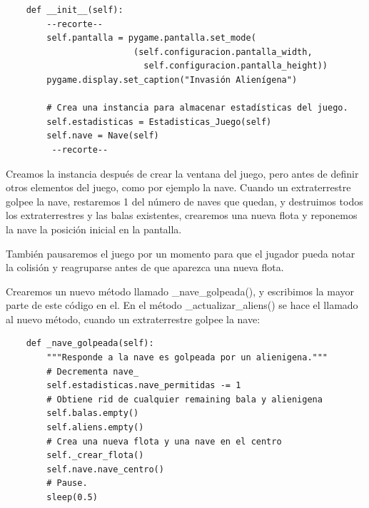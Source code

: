 \hspace{-2.4cm}{\ttfamily \scriptsize invasión}

\vspace{-0.2cm}
\hspace{-2.1cm}{\ttfamily \scriptsize \_alien.py}\vspace{-0.84cm}
\begin{lstlisting}
    def __init__(self):
        --recorte--
        self.pantalla = pygame.pantalla.set_mode(
                         (self.configuracion.pantalla_width,
                           self.configuracion.pantalla_height))
        pygame.display.set_caption("Invasión Alienígena")

        # Crea una instancia para almacenar estadísticas del juego.
        self.estadisticas = Estadisticas_Juego(self)
        self.nave = Nave(self)
         --recorte--
\end{lstlisting}


Creamos la instancia después de crear la ventana del juego, pero antes de definir otros elementos del juego, como por ejemplo la nave.
Cuando un extraterrestre golpee la nave, restaremos 1 del número de naves que quedan, y destruimos todos los extraterrestres y las balas existentes, crearemos una nueva flota y reponemos la nave la posición inicial en la pantalla. 

También pausaremos el juego por un momento para que el jugador pueda notar la colisión y reagruparse antes de que 
aparezca una nueva flota.

Crearemos un nuevo método llamado {\ttfamily \_nave\_golpeada()}, y escribimos la mayor parte de este código en el. 
En el método {\ttfamily \_actualizar\_aliens()} se hace el llamado al nuevo método, cuando un extraterrestre golpee la nave:


\hspace{-2.4cm}{\ttfamily \scriptsize invasión}

\vspace{-0.2cm}
\hspace{-2.1cm}{\ttfamily \scriptsize \_alien.py}\vspace{-0.84cm}
\begin{lstlisting}
    def _nave_golpeada(self):
        """Responde a la nave es golpeada por un alienigena."""
        # Decrementa nave_
        self.estadisticas.nave_permitidas -= 1
        # Obtiene rid de cualquier remaining bala y alienigena
        self.balas.empty()
        self.aliens.empty()
        # Crea una nueva flota y una nave en el centro
        self._crear_flota()
        self.nave.nave_centro()
        # Pause.
        sleep(0.5)
\end{lstlisting}


